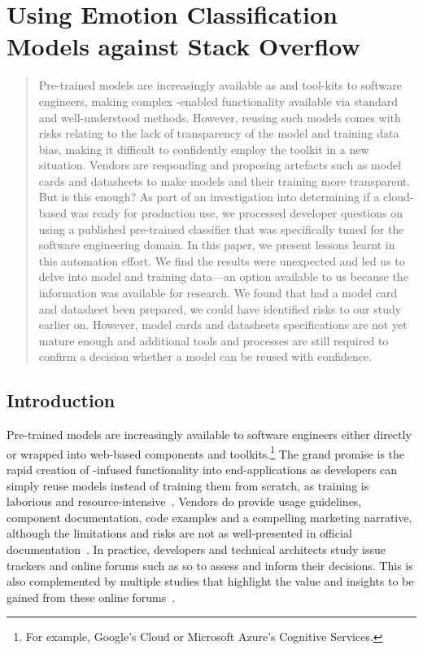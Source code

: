 
\chapter[Using Emotion Classification Models against Stack Overlow]
{Using Emotion Classification Models against Stack Overflow}
\label{ch:caise2021}
\graphicspath{{mainmatter/publications/figures/caise2021/}}

\glsresetall
\begin{abstract}
Pre-trained  models are increasingly available as  and tool-kits to software engineers, making complex -enabled functionality available via standard and well-understood methods. However, reusing such models comes with risks relating to the lack of transparency of the model and training data bias, making it difficult to confidently employ the toolkit in a new situation.  Vendors are responding and proposing artefacts such as model cards and datasheets to make models and their training more transparent.  But is this enough?  As part of an investigation into determining if a cloud-based  was ready for production use, we processed developer questions on  using a published pre-trained classifier that was specifically tuned for the software engineering domain. In this paper, we present lessons learnt in this automation effort. We find the results were unexpected and led us to delve into model and training data---an option available to us because the information was available for research.  We found that had a model card and datasheet been prepared, we could have identified risks to our study earlier on. However, model cards and datasheets specifications are not yet mature enough and additional tools and processes are still required to confirm a decision whether a model can be reused with confidence.
\end{abstract}
\glsresetall

\section{Introduction}
Pre-trained  models are increasingly available to software engineers either directly or wrapped into web-based components and toolkits.\footnote{For example, Google's Cloud  or Microsoft Azure's Cognitive Services.} The grand promise is the rapid creation of -infused functionality into end-applications as developers can simply reuse models instead of training them from scratch, as training is laborious and resource-intensive~\citep{RamanAnandHoder2015}. Vendors do provide usage guidelines, component documentation, code examples and a compelling marketing narrative, although the limitations and risks are not as well-presented in  official documentation~\citep{Cummaudo:2019icsme,Cummaudo:2020icse}. 
In practice, developers and technical architects study issue trackers and online forums such as \gls{so} to assess and inform their decisions. This is also complemented by multiple studies that highlight the value and insights to be gained from these online forums~\citep{Abdalkareem2017WhatOverflow,Storey2014}.

